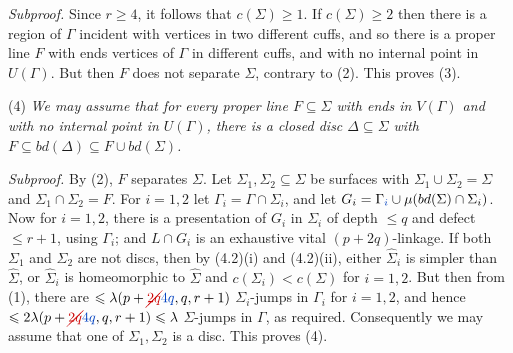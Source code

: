 \textit{Subproof.} Since $r \ge 4$, it follows that $c(\Sigma) \ge 1$. If $c(\Sigma) \ge 2$ then there is a region of $\Gamma$ incident with vertices in two different cuffs, and so there is a proper line $F$ with ends vertices of $\Gamma$ in different cuffs, and with no internal point in $U(\Gamma)$. But then $F$ does not separate $\Sigma$, contrary to (2). This proves (3).

\hspace*{12pt}(4) \textit{We may assume that for every proper line $F \subseteq \Sigma$ with ends in $V(\Gamma)$ and with no internal point in $U(\Gamma)$, there is a closed disc $\Delta \subseteq \Sigma$ with $F \subseteq bd(\Delta) \subseteq F \cup bd(\Sigma)$.}

\textit{Subproof.} By (2), $F$ separates $\Sigma$. Let $\Sigma_1, \Sigma_2 \subseteq \Sigma$ be surfaces with $\Sigma_1 \cup \Sigma_2 = \Sigma$ and $\Sigma_1 \cap \Sigma_2 = F$. For $i = 1, 2$ let $\Gamma_i = \Gamma \cap \Sigma_i$, and let $G_i = \Gamma_{\fix{i}} \cup \mu(bd(\Sigma) \cap \Sigma_i)$. Now for $i = 1, 2$, there is a presentation of $G_i$ in $\Sigma_i$ of depth $\le q$ and defect $\le r + 1$, using $\Gamma_i$; and $L \cap G_i$ is an exhaustive vital $(p + 2q)$-linkage. If both $\Sigma_1$ and $\Sigma_2$ are not discs, then by (4.2)(i) and (4.2)(ii), either $\hat{\Sigma}_i$ is simpler than $\hat{\Sigma}$, or $\hat{\Sigma}_i$ is homeomorphic to $\hat{\Sigma}$ and $c(\Sigma_i) < c(\Sigma)$ for $i = 1, 2$. But then from (1), there are $\le \lambda(p + \delm{2q}\fix{4q}, q, r + 1)$ $\Sigma_i$-jumps in $\Gamma_i$ for $i = 1, 2$, and hence $\le 2\lambda(p + \delm{2q}\fix{4q}, q, r + 1) \le \lambda$ $\Sigma$-jumps in $\Gamma$, as required. Consequently we may assume that one of $\Sigma_1, \Sigma_2$ is a disc. This proves (4).

